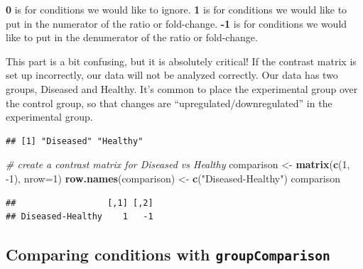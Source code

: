 \documentclass[]{book}
\newenvironment{Shaded}{\begin{snugshade}}{\end{snugshade}}
\newcommand{\CommentTok}[1]{\textcolor[rgb]{0.56,0.35,0.01}{\textit{#1}}}
\newcommand{\DataTypeTok}[1]{\textcolor[rgb]{0.13,0.29,0.53}{#1}}
\newcommand{\DecValTok}[1]{\textcolor[rgb]{0.00,0.00,0.81}{#1}}
\newcommand{\KeywordTok}[1]{\textcolor[rgb]{0.13,0.29,0.53}{\textbf{#1}}}
\newcommand{\NormalTok}[1]{#1}
\newcommand{\OperatorTok}[1]{\textcolor[rgb]{0.81,0.36,0.00}{\textbf{#1}}}
\newcommand{\StringTok}[1]{\textcolor[rgb]{0.31,0.60,0.02}{#1}}
\begin{document}
\textbf{0} is for conditions we would like to ignore.
\textbf{1} is for conditions we would like to put in the numerator of the ratio or fold-change.
\textbf{-1} is for conditions we would like to put in the denumerator of the ratio or fold-change.

This part is a bit confusing, but it is absolutely critical! If the contrast matrix is set up incorrectly, our data will not be analyzed correctly. Our data has two groups, Diseased and Healthy. It's common to place the experimental group over the control group, so that changes are ``upregulated/downregulated'' in the experimental group.

\begin{Shaded}
\end{Shaded}

\begin{verbatim}
## [1] "Diseased" "Healthy"
\end{verbatim}

\begin{Shaded}
\begin{Highlighting}[]
\CommentTok{# create a contrast matrix for Diseased vs Healthy}
\NormalTok{comparison <-}\StringTok{ }\KeywordTok{matrix}\NormalTok{(}\KeywordTok{c}\NormalTok{(}\DecValTok{1}\NormalTok{, }\DecValTok{-1}\NormalTok{), }\DataTypeTok{nrow=}\DecValTok{1}\NormalTok{)}
\KeywordTok{row.names}\NormalTok{(comparison) <-}\StringTok{ }\KeywordTok{c}\NormalTok{(}\StringTok{"Diseased-Healthy"}\NormalTok{)}
\NormalTok{comparison}
\end{Highlighting}
\end{Shaded}

\begin{verbatim}
##                  [,1] [,2]
## Diseased-Healthy    1   -1
\end{verbatim}

\hypertarget{comparing-conditions-with-groupcomparison}{%
\subsection{\texorpdfstring{Comparing conditions with \texttt{groupComparison}}{Comparing conditions with groupComparison}}\label{comparing-conditions-with-groupcomparison}}
\end{document}
